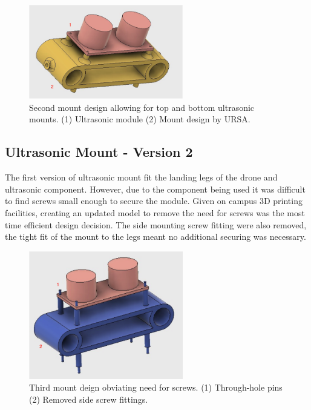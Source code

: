 \documentclass[capstone_report.tex]{subfiles}
\begin{document}
\begin{figure}[H]
    \centering
    \includegraphics[width=0.6\textwidth]{imgs/mount2_labelled.png}
    \caption{Second mount design allowing for top and bottom ultrasonic mounts. (1) Ultrasonic module (2) Mount design by URSA.\label{fig:mount2}}
\end{figure}

\subsection{Ultrasonic Mount - Version 2}

The first version of ultrasonic mount fit the landing legs of the drone and ultrasonic component.  However, due to the component being used it was difficult to find screws small enough to secure the module.  Given on campus 3D printing facilities, creating an updated model to remove the need for screws was the most time efficient design decision.  The side mounting screw fitting were also removed, the tight fit of the mount to the legs meant no additional securing was necessary.

\begin{figure}[H]
    \centering
    \includegraphics[width=0.6\textwidth]{imgs/mount3_labelled.png}
    \caption{Third mount deign obviating need for screws. (1) Through-hole pins (2) Removed side screw fittings. \label{fig:mount3}}
\end{figure}
\end{document}
